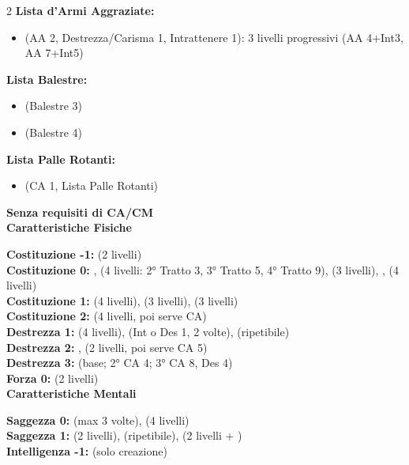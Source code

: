 \begin{multicols}{2}
	\textbf{Lista d'Armi Aggraziate:}
	\begin{itemize}
		\item {} (AA 2, Destrezza/Carisma 1, Intrattenere 1): 3 livelli progressivi (AA 4+Int3, AA 7+Int5)
	\end{itemize}

	\textbf{Lista Balestre:}
	\begin{itemize}
		\item {} (Balestre 3)
		\item {} (Balestre 4)
	\end{itemize}

	\textbf{Lista Palle Rotanti:}
	\begin{itemize}
		\item {} (CA 1, Lista Palle Rotanti)
	\end{itemize}

	\textbf{{\large Senza requisiti di CA/CM}}\\

	\textbf{Caratteristiche Fisiche}

	\textbf{Costituzione -1:}  (2 livelli)\\
	\textbf{Costituzione 0:} ,  (4 livelli: 2° Tratto 3, 3° Tratto 5, 4° Tratto 9),  (3 livelli), ,  (4 livelli)\\
	\textbf{Costituzione 1:}  (4 livelli),  (3 livelli),  (3 livelli)\\
	\textbf{Costituzione 2:}  (4 livelli, poi serve CA)\\
	\textbf{Destrezza 1:}  (4 livelli),  (Int o Des 1, 2 volte),  (ripetibile)\\
	\textbf{Destrezza 2:} ,  (2 livelli, poi serve CA 5)\\
	\textbf{Destrezza 3:}  (base; 2° CA 4; 3° CA 8, Des 4)\\
	\textbf{Forza 0:}  (2 livelli)\\

	\textbf{Caratteristiche Mentali}

	\textbf{Saggezza 0:}  (max 3 volte),  (4 livelli)\\
	\textbf{Saggezza 1:}  (2 livelli),  (ripetibile),  (2 livelli + )\\
	\textbf{Intelligenza -1:}  (solo creazione)\\


\end{multicols}
